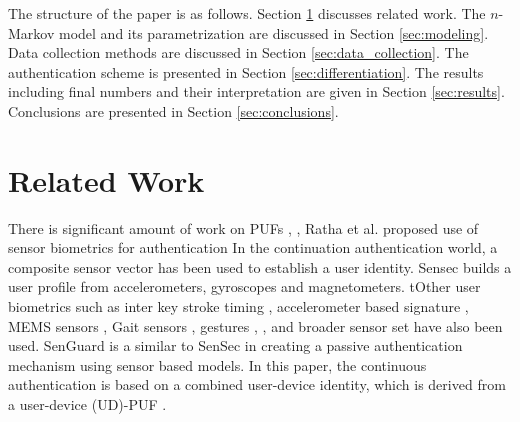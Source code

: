 \documentclass{acm_proc_article-sp}
\begin{document}
The structure of the paper is as follows. Section \ref{sec:related_work} discusses related work. The $n$-Markov model and its parametrization are discussed in Section \ref{sec:modeling}. 
Data collection methods are discussed in Section \ref{sec:data_collection}. The authentication scheme is presented in Section \ref{sec:differentiation}. The results including final numbers and 
their interpretation are given in Section \ref{sec:results}. Conclusions are presented in Section \ref{sec:conclusions}. 

\section{Related Work}
\label{sec:related_work}
There is significant amount of work on PUFs \cite{Devadas:2009:PUF}, \cite{PUFIntro}, \cite{Gassend:2002:SPR}
Ratha et al. \cite{Ratha:2001} proposed use of sensor biometrics for authentication
In the continuation authentication world, a composite sensor vector \cite{zhu2013sensec} has been used
to establish a user identity. Sensec builds a user profile from accelerometers, gyroscopes and magnetometers. tOther user biometrics such as inter key stroke timing 
\cite{KeystrokeHASE14},  accelerometer based signature \cite{Liu:2009:UAP}, MEMS sensors
\cite{Aysu:2013:DFL}, Gait sensors \cite{Gait}, gestures \cite{touchscreengestures}, \cite{Gesture14}, and 
broader sensor set \cite{Dey:2013:AHP} have also been
used. SenGuard \cite{shi2011senguard} is a similar to SenSec in creating a passive
authentication mechanism using sensor based models. In this paper, the continuous authentication is based on a combined user-device identity,
which is derived from a user-device (UD)-PUF \cite{ScheelTyagi15}.






\end{document}

